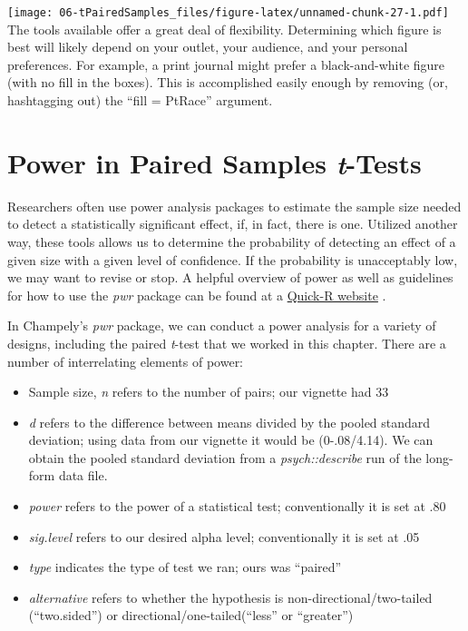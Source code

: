 \documentclass[
  11pt,
]{book}
\providecommand{\tightlist}{%
  \setlength{\itemsep}{0pt}\setlength{\parskip}{0pt}}
\begin{document}
\texttt{[image: 06-tPairedSamples\_files/figure-latex/unnamed-chunk-27-1.pdf]} The tools available offer a great deal of flexibility. Determining which figure is best will likely depend on your outlet, your audience, and your personal preferences. For example, a print journal might prefer a black-and-white figure (with no fill in the boxes). This is accomplished easily enough by removing (or, hashtagging out) the ``fill = PtRace'' argument.

\hypertarget{power-in-paired-samples-t-tests}{%
\section{\texorpdfstring{Power in Paired Samples \emph{t}-Tests}{Power in Paired Samples t-Tests}}\label{power-in-paired-samples-t-tests}}

Researchers often use power analysis packages to estimate the sample size needed to detect a statistically significant effect, if, in fact, there is one. Utilized another way, these tools allows us to determine the probability of detecting an effect of a given size with a given level of confidence. If the probability is unacceptably low, we may want to revise or stop. A helpful overview of power as well as guidelines for how to use the \emph{pwr} package can be found at a \href{https://www.statmethods.net/stats/power.html}{Quick-R website} \citep{kabacoff_power_2017}.

In Champely's \emph{pwr} package, we can conduct a power analysis for a variety of designs, including the paired \emph{t}-test that we worked in this chapter. There are a number of interrelating elements of power:

\begin{itemize}
\tightlist
\item
  Sample size, \emph{n} refers to the number of pairs; our vignette had 33
\item
  \emph{d} refers to the difference between means divided by the pooled standard deviation; using data from our vignette it would be (0-.08/4.14). We can obtain the pooled standard deviation from a \emph{psych::describe} run of the long-form data file.
\item
  \emph{power} refers to the power of a statistical test; conventionally it is set at .80
\item
  \emph{sig.level} refers to our desired alpha level; conventionally it is set at .05
\item
  \emph{type} indicates the type of test we ran; ours was ``paired''
\item
  \emph{alternative} refers to whether the hypothesis is non-directional/two-tailed (``two.sided'') or directional/one-tailed(``less'' or ``greater'')
\end{itemize}
\end{document}
